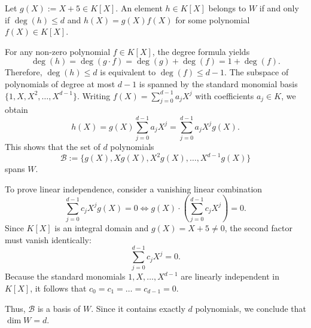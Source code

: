 \begin{exercisesolution*}
\label{sol:polynomials_linear_factor_dimension}
Let $g(X) := X + 5 \in K[X]$. An element $h \in K[X]$ belongs to $W$ if and only if $\deg(h) \le d$ and $h(X) = g(X) f(X)$ for some polynomial $f(X) \in K[X]$.

For any non-zero polynomial $f \in K[X]$, the degree formula yields
\[
    \deg(h) = \deg(g \cdot f) = \deg(g) + \deg(f) = 1 + \deg(f).
\]
Therefore, $\deg(h) \le d$ is equivalent to $\deg(f) \le d - 1$. The subspace of polynomials of degree at most $d - 1$ is spanned by the standard monomial basis $\{1, X, X^2, \dots, X^{d-1}\}$. Writing $f(X) = \sum_{j=0}^{d-1} a_j X^j$ with coefficients $a_j \in K$, we obtain
\[
    h(X) = g(X) \sum_{j=0}^{d-1} a_j X^j = \sum_{j=0}^{d-1} a_j X^j g(X).
\]
This shows that the set of $d$ polynomials
\[
    \mathcal{B} := \{g(X), X g(X), X^2 g(X), \dots, X^{d-1} g(X)\}
\]
spans $W$.

To prove linear independence, consider a vanishing linear combination
\[
    \sum_{j=0}^{d-1} c_j X^j g(X) = 0 \iff g(X) \cdot \left( \sum_{j=0}^{d-1} c_j X^j \right) = 0.
\]
Since $K[X]$ is an integral domain and $g(X) = X + 5 \neq 0$, the second factor must vanish identically:
\[
    \sum_{j=0}^{d-1} c_j X^j = 0.
\]
Because the standard monomials $1, X, \dots, X^{d-1}$ are linearly independent in $K[X]$, it follows that $c_0 = c_1 = \dots = c_{d-1} = 0$.

Thus, $\mathcal{B}$ is a basis of $W$. Since it contains exactly $d$ polynomials, we conclude that $\dim W = d$.
\end{exercisesolution*}

